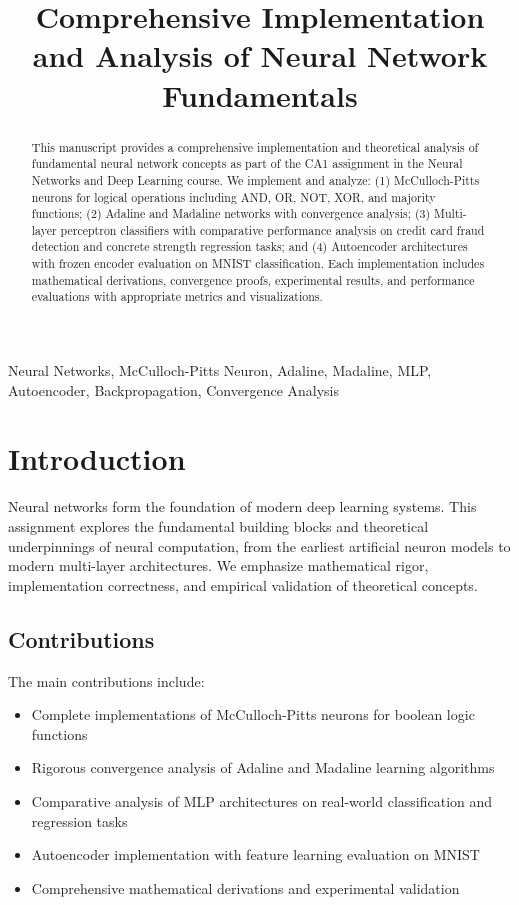 \documentclass[conference]{IEEEtran}
\title{Comprehensive Implementation and Analysis of Neural Network Fundamentals \vspace{-0.6em}}
\author{\IEEEauthorblockN{Babak Mohtasham, Ranjbar, Hosseini, Javad, Mohammad Ghaderi, Yousef}
\IEEEauthorblockA{Faculty of Electrical \& Computer Engineering, University of Tehran\\
\texttt{(team email placeholder)}}}
\begin{document}
\maketitle

\begin{abstract}
This manuscript provides a comprehensive implementation and theoretical analysis of fundamental neural network concepts as part of the CA1 assignment in the Neural Networks and Deep Learning course. We implement and analyze: (1) McCulloch-Pitts neurons for logical operations including AND, OR, NOT, XOR, and majority functions; (2) Adaline and Madaline networks with convergence analysis; (3) Multi-layer perceptron classifiers with comparative performance analysis on credit card fraud detection and concrete strength regression tasks; and (4) Autoencoder architectures with frozen encoder evaluation on MNIST classification. Each implementation includes mathematical derivations, convergence proofs, experimental results, and performance evaluations with appropriate metrics and visualizations.
\end{abstract}

\begin{IEEEkeywords}
Neural Networks, McCulloch-Pitts Neuron, Adaline, Madaline, MLP, Autoencoder, Backpropagation, Convergence Analysis
\end{IEEEkeywords}

\section{Introduction}
Neural networks form the foundation of modern deep learning systems. This assignment explores the fundamental building blocks and theoretical underpinnings of neural computation, from the earliest artificial neuron models to modern multi-layer architectures. We emphasize mathematical rigor, implementation correctness, and empirical validation of theoretical concepts.

\subsection{Contributions}
The main contributions include:
\begin{itemize}
    \item Complete implementations of McCulloch-Pitts neurons for boolean logic functions
    \item Rigorous convergence analysis of Adaline and Madaline learning algorithms
    \item Comparative analysis of MLP architectures on real-world classification and regression tasks
    \item Autoencoder implementation with feature learning evaluation on MNIST
    \item Comprehensive mathematical derivations and experimental validation
\end{itemize}
\end{document}
